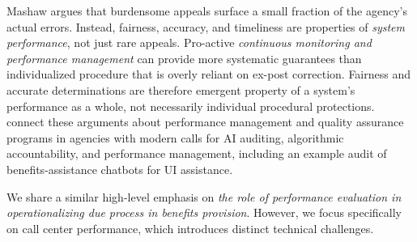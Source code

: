 \documentclass[manuscript,screen,authorversion]{acmart}
\begin{document}
Mashaw argues that burdensome appeals surface a small fraction of the agency's actual errors. Instead, fairness, accuracy, and timeliness are properties of \textit{system performance}, not just rare appeals. Pro-active \textit{continuous monitoring and performance management} can provide more systematic guarantees than individualized procedure that is overly reliant on ex-post correction. {Fairness and accurate determinations are therefore emergent property of a system's performance as a whole, not necessarily individual procedural protections}. %
\citep{ho2017managing,ames2020due} connect these arguments about performance management and quality assurance programs in agencies %
with modern calls for AI auditing, algorithmic accountability, and performance management, including \citep{ho2025evaluation} an example audit of benefits-assistance chatbots for UI assistance.%

We share a similar high-level emphasis on \textit{the role of performance evaluation in operationalizing due process in benefits provision}. However, we focus specifically on call center performance, which introduces distinct technical challenges. %






\end{document}
